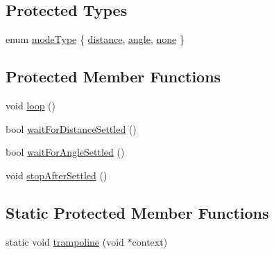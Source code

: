 \subsection*{Protected Types}
\begin{DoxyCompactItemize}
\item 
enum \mbox{\hyperlink{classokapi_1_1ChassisControllerPID_a74792367688870f72f88c486c96b8368}{mode\+Type}} \{ \mbox{\hyperlink{classokapi_1_1ChassisControllerPID_a74792367688870f72f88c486c96b8368a8675301d26c1da1d766934478dd4a7cd}{distance}}, 
\mbox{\hyperlink{classokapi_1_1ChassisControllerPID_a74792367688870f72f88c486c96b8368acbd60074aa1c74a74fec252c3bb87acd}{angle}}, 
\mbox{\hyperlink{classokapi_1_1ChassisControllerPID_a74792367688870f72f88c486c96b8368a7727725f70ef5c5845fdc2004c6cedd7}{none}}
 \}
\end{DoxyCompactItemize}
\subsection*{Protected Member Functions}
\begin{DoxyCompactItemize}
\item 
void \mbox{\hyperlink{classokapi_1_1ChassisControllerPID_ab78f673aa582db34b374f0fb6398be9e}{loop}} ()
\item 
bool \mbox{\hyperlink{classokapi_1_1ChassisControllerPID_a991349bc2dad71324203d4b298edd845}{wait\+For\+Distance\+Settled}} ()
\item 
bool \mbox{\hyperlink{classokapi_1_1ChassisControllerPID_a736ca24bff70d502f5ff724ed88f9f62}{wait\+For\+Angle\+Settled}} ()
\item 
void \mbox{\hyperlink{classokapi_1_1ChassisControllerPID_ac8dffc9df4025ece0303194a0fbc58ff}{stop\+After\+Settled}} ()
\end{DoxyCompactItemize}
\subsection*{Static Protected Member Functions}
\begin{DoxyCompactItemize}
\item 
static void \mbox{\hyperlink{classokapi_1_1ChassisControllerPID_ad0b7cbee2a31e88fdd4e003aea19898e}{trampoline}} (void $\ast$context)
\end{DoxyCompactItemize}
